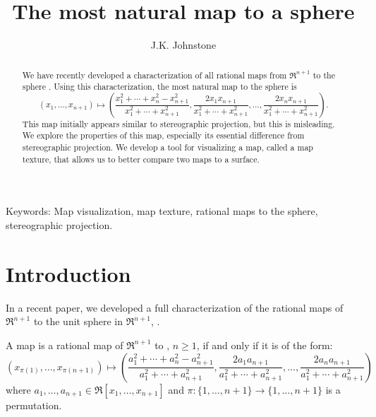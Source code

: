 \newif\ifFull
\Fullfalse

\SingleSpace

\setlength{\oddsidemargin}{0pt}
\setlength{\topmargin}{-.25in}	%
\setlength{\headsep}{3em}
\setlength{\textheight}{8.75in}
\setlength{\textwidth}{6.5in}
\setlength{\columnsep}{5mm}		%

\pagestyle{myheadings}


\title{The most natural map to a sphere}
\author{J.K. Johnstone}


\maketitle

\begin{abstract}
We have recently developed a characterization of all rational maps
from $\Re^{n+1}$ to the sphere .
Using this characterization, 
the most natural map to the sphere is
\[ (x_1,\ldots,x_{n+1}) \mapsto 
	(\frac{x_1^2 + \cdots + x_{n}^2 - x_{n+1}^2}{x_1^2 + \cdots + x_{n+1}^2},
	 \frac{2x_1x_{n+1}}{x_1^2 + \cdots + x_{n+1}^2},\ldots,
	 \frac{2x_{n}x_{n+1}}{x_1^2 + \cdots + x_{n+1}^2}).
\]
This map initially appears similar to stereographic projection,
but this is misleading.
We explore the properties of this map, especially its essential difference
from stereographic projection.
We develop a tool for visualizing a map, called a map texture,
that allows us to better compare two maps to a surface.
\end{abstract}

\noindent Keywords: Map visualization, map texture,
		rational maps to the sphere, stereographic projection.

\clearpage

\section{Introduction}

In a recent paper, we developed 
a full characterization of the rational maps of $\Re^{n+1}$ to the 
unit sphere in $\Re^{n+1}$, .

\begin{theorem}
\label{thm:nn}
A map is a rational map of $\Re^{n+1}$ to , $n \geq 1$, if and only if
it is of the form:
\begin{equation}
\label{eq:normalform}
	(x_{\pi(1)},\ldots,x_{\pi(n+1)}) \mapsto 
	(\frac{a_1^2 + \cdots + a_{n}^2 - a_{n+1}^2}{a_1^2 + \cdots + a_{n+1}^2},
	 \frac{2a_1a_{n+1}}{a_1^2 + \cdots + a_{n+1}^2},
	 \ldots,
	 \frac{2a_{n}a_{n+1}}{a_1^2 + \cdots + a_{n+1}^2})
\end{equation}
where $a_1,\ldots,a_{n+1} \in \Re[x_1,\ldots,x_{n+1}]$
and $\pi: \{1,\ldots,n+1\} \rightarrow \{1,\ldots,n+1\}$ is a permutation.
\end{theorem}

